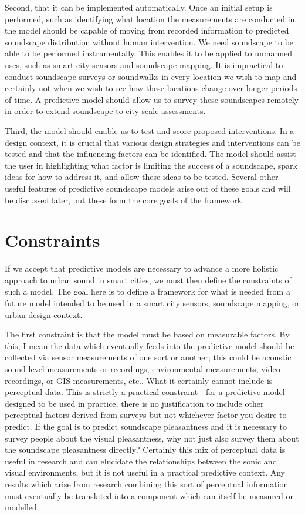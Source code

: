Second, that it can be implemented automatically. Once an initial setup is performed, such as identifying what location the measurements are conducted in, the model should be capable of moving from recorded information to predicted soundscape distribution without human intervention. We need soundscape to be able to be performed instrumentally. This enables it to be applied to unmanned uses, such as smart city sensors and soundscape mapping. It is impractical to conduct soundscape surveys or soundwalks in every location we wish to map and certainly not when we wish to see how these locations change over longer periods of time. A predictive model should allow us to survey these soundscapes remotely in order to extend soundscape to city-scale assessments. 

Third, the model should enable us to test and score proposed interventions. In a design context, it is crucial that various design strategies and interventions can be tested and that the influencing factors can be identified. The model should assist the user in highlighting what factor is limiting the success of a soundscape, spark ideas for how to address it, and allow these ideas to be tested. Several other useful features of predictive soundscape models arise out of these goals and will be discussed later, but these form the core goals of the framework.

\section{Constraints}
\label{sec:modelConstraints}
If we accept that predictive models are necessary to advance a more holistic approach to urban sound in smart cities, we must then define the constraints of such a model. The goal here is to define a framework for what is needed from a future model intended to be used in a smart city sensors, soundscape mapping, or urban design context.

The first constraint is that the model must be based on measurable factors. By this, I mean the data which eventually feeds into the predictive model should be collected via sensor measurements of one sort or another; this could be acoustic sound level measurements or recordings, environmental measurements, video recordings, or GIS measurements, etc.. What it certainly cannot include is perceptual data. This is strictly a practical constraint - for a predictive model designed to be used in practice, there is no justification to include other perceptual factors derived from surveys but not whichever factor you desire to predict. If the goal is to predict soundscape pleasantness and it is necessary to survey people about the visual pleasantness, why not just also survey them about the soundscape pleasantness directly? Certainly this mix of perceptual data is useful in research and can elucidate the relationships between the sonic and visual environments, but it is not useful in a practical predictive context. Any results which arise from research combining this sort of perceptual information must eventually be translated into a component which can itself be measured or modelled.

